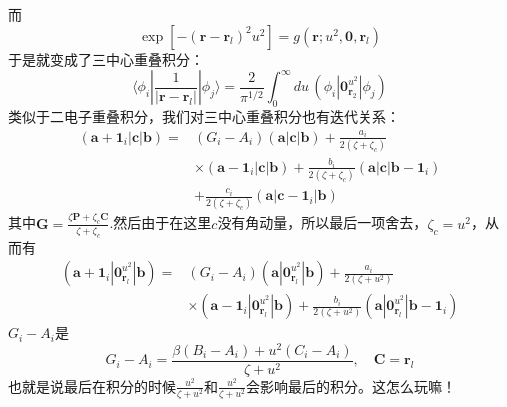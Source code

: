 \documentclass[12pt,a4paper,openany,twoside]{book}
\numberwithin{equation}{section}
\begin{document}
          而
          \begin{equation}
              \exp \left[-\left(\boldsymbol{r}-\boldsymbol{r}_{l}\right)^{2} u^{2}\right] = g(\boldsymbol{r};u^2,\boldsymbol{0},\boldsymbol{r}_l)
          \end{equation}
          于是就变成了三中心重叠积分：
          \begin{equation}
              \langle \phi_i | \frac{1}{|\boldsymbol{r} - \boldsymbol{r}_l|} |\phi_j \rangle = \frac{2}{\pi^{1 / 2}} \int_0^\infty du \, (\phi_i|\boldsymbol{0}_{\boldsymbol{r}_2}^{u^2}|\phi_j)
          \end{equation}
          类似于二电子重叠积分，我们对三中心重叠积分也有迭代关系：
          \begin{equation}
          \begin{aligned}
              \left(\boldsymbol{a}+\boldsymbol{1}_{i}|\boldsymbol{c}| \boldsymbol{b}\right)=&\left(G_{i}-A_{i}\right)(\boldsymbol{a}|\boldsymbol{c}| \boldsymbol{b})+\frac{a_i}{2\left(\zeta+\zeta_{c}\right)} \\ 
          & \times \left(\boldsymbol{a}-\boldsymbol{1}_{i}|\boldsymbol{c}| \boldsymbol{b}\right)+\frac{ b_i}{2\left(\zeta+\zeta_{c}\right)} \left(\boldsymbol{a} | \boldsymbol{c}|\boldsymbol{b}-\boldsymbol{1}_{i}\right)\\ 
          &+\frac{c_i}{2\left(\zeta+\zeta_{c}\right)}\left(\boldsymbol{a}\left|\boldsymbol{c}-\boldsymbol{1}_{i}\right| \boldsymbol{b}\right)
          \end{aligned}
          \end{equation}
          其中$\boldsymbol{G}=\frac{\zeta \boldsymbol{P}+\zeta_{c} \boldsymbol{C}}{\zeta+\zeta_{c}}$.然后由于在这里$c$没有角动量，所以最后一项舍去，$\zeta_c = u^2$，从而有
          \begin{equation}
              \begin{aligned}
              \left(\boldsymbol{a}+\boldsymbol{1}_{i}|\boldsymbol{0}_{\boldsymbol{r}_l}^{u^2}| \boldsymbol{b}\right)= & \left(G_{i}-A_{i}\right)(\boldsymbol{a}|\boldsymbol{0}_{\boldsymbol{r}_l}^{u^2}| \boldsymbol{b})+\frac{a_i}{2\left(\zeta + u^2\right)} \\ 
              & \times \left(\boldsymbol{a}-\boldsymbol{1}_{i}|\boldsymbol{0}_{\boldsymbol{r}_l}^{u^2}| \boldsymbol{b}\right)+\frac{ b_i}{2\left(\zeta + u^2\right)} \left(\boldsymbol{a} | \boldsymbol{0}_{\boldsymbol{r}_l}^{u^2}|\boldsymbol{b}-\boldsymbol{1}_{i}\right)
              \end{aligned}
          \end{equation}
          $G_i-A_i$是
          \begin{equation}
              G_i - A_i = \frac{\beta (B_i-A_i) + u^2 (C_i - A_i)}{\zeta + u^2}, \quad \boldsymbol{C} = \boldsymbol{r}_l
          \end{equation}
          也就是说最后在积分的时候$\frac{u^2}{\zeta+u^2}$和$\frac{u^2}{\zeta+u^2}$会影响最后的积分。这怎么玩嘛！
\end{document}
